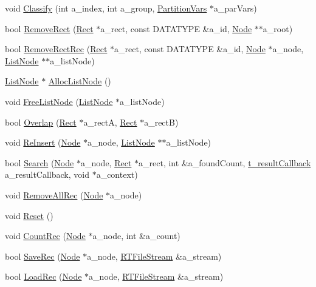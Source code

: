 \begin{DoxyCompactItemize}
void \hyperlink{classRTree_a5da8614a152145988f010a0b7ff9cb4d}{Classify} (int a\-\_\-index, int a\-\_\-group, \hyperlink{structRTree_1_1PartitionVars}{Partition\-Vars} $\ast$a\-\_\-par\-Vars)
\item 
bool \hyperlink{classRTree_a64a1092e85775014ce01e1bb6bc8a938}{Remove\-Rect} (\hyperlink{structRTree_1_1Rect}{Rect} $\ast$a\-\_\-rect, const D\-A\-T\-A\-T\-Y\-P\-E \&a\-\_\-id, \hyperlink{structRTree_1_1Node}{Node} $\ast$$\ast$a\-\_\-root)
\item 
bool \hyperlink{classRTree_a519d3084a57b45ed4e4167b382bc977e}{Remove\-Rect\-Rec} (\hyperlink{structRTree_1_1Rect}{Rect} $\ast$a\-\_\-rect, const D\-A\-T\-A\-T\-Y\-P\-E \&a\-\_\-id, \hyperlink{structRTree_1_1Node}{Node} $\ast$a\-\_\-node, \hyperlink{structRTree_1_1ListNode}{List\-Node} $\ast$$\ast$a\-\_\-list\-Node)
\item 
\hyperlink{structRTree_1_1ListNode}{List\-Node} $\ast$ \hyperlink{classRTree_aa688a31e4de0090985045cfabfa42d2d}{Alloc\-List\-Node} ()
\item 
void \hyperlink{classRTree_a0c92660832f03d899608d73b994e95a5}{Free\-List\-Node} (\hyperlink{structRTree_1_1ListNode}{List\-Node} $\ast$a\-\_\-list\-Node)
\item 
bool \hyperlink{classRTree_aa5b369536a94aa8ad9ec3b4f8f68302c}{Overlap} (\hyperlink{structRTree_1_1Rect}{Rect} $\ast$a\-\_\-rect\-A, \hyperlink{structRTree_1_1Rect}{Rect} $\ast$a\-\_\-rect\-B)
\item 
void \hyperlink{classRTree_a5d2b072588eae9e9058224942ae0294f}{Re\-Insert} (\hyperlink{structRTree_1_1Node}{Node} $\ast$a\-\_\-node, \hyperlink{structRTree_1_1ListNode}{List\-Node} $\ast$$\ast$a\-\_\-list\-Node)
\item 
bool \hyperlink{classRTree_a7f84e7f718b4473c435862965033a8d4}{Search} (\hyperlink{structRTree_1_1Node}{Node} $\ast$a\-\_\-node, \hyperlink{structRTree_1_1Rect}{Rect} $\ast$a\-\_\-rect, int \&a\-\_\-found\-Count, \hyperlink{classRTree_a989db5f20fcdc26231e8b76be83caee4}{t\-\_\-result\-Callback} a\-\_\-result\-Callback, void $\ast$a\-\_\-context)
\item 
void \hyperlink{classRTree_a5045d833566114335162fda10d58081d}{Remove\-All\-Rec} (\hyperlink{structRTree_1_1Node}{Node} $\ast$a\-\_\-node)
\item 
void \hyperlink{classRTree_a2508b9d85f5b5f553b313356c05c6e0c}{Reset} ()
\item 
void \hyperlink{classRTree_a22345d494c1d6bf907444f17802bd864}{Count\-Rec} (\hyperlink{structRTree_1_1Node}{Node} $\ast$a\-\_\-node, int \&a\-\_\-count)
\item 
bool \hyperlink{classRTree_a53a8af8a04a9a4a9eb93a6a0792fea95}{Save\-Rec} (\hyperlink{structRTree_1_1Node}{Node} $\ast$a\-\_\-node, \hyperlink{classRTFileStream}{R\-T\-File\-Stream} \&a\-\_\-stream)
\item 
bool \hyperlink{classRTree_aa432ad1d5dfc151c1f8eac388af41968}{Load\-Rec} (\hyperlink{structRTree_1_1Node}{Node} $\ast$a\-\_\-node, \hyperlink{classRTFileStream}{R\-T\-File\-Stream} \&a\-\_\-stream)
\end{DoxyCompactItemize}
